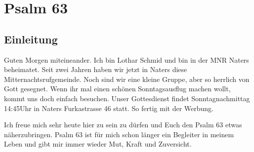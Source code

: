\documentclass[14pt]{../../inc/mybib}
\author{Lothar Schmid}
\begin{document}
\setlength{\baselineskip}{1.5\baselineskip}

\section*{Psalm 63}
    \subsection*{Einleitung}
    Guten Morgen miteineander. Ich bin Lothar Schmid und bin in der MNR Naters beheimatet. Seit zwei Jahren haben wir jetzt in Naters diese Mitternachtsrufgemeinde. Noch sind wir eine kleine Gruppe, aber so herrlich von Gott gesegnet. Wenn ihr mal einen schönen Sonntagsausflug machen wollt, kommt uns doch einfach besuchen. Unser Gottesdienst findet Sonntagnachmittag 14:45Uhr in Naters Furkastrasse 46 statt. So fertig mit der Werbung.
    
    Ich freue mich sehr heute hier zu sein zu dürfen und Euch den Psalm 63 etwas näherzubringen. Psalm 63 ist für mich schon länger ein Begleiter in meinem Leben und gibt mir immer wieder Mut, Kraft und Zuversicht. 
\end{document}
